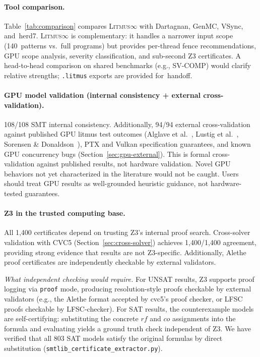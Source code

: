 \documentclass[11pt]{article}
\newcommand{\litmus}{\textsc{Litmus$\infty$}}
\begin{document}
\paragraph{Tool comparison.}
Table~\ref{tab:comparison} compares \litmus{} with
Dartagnan, GenMC, VSync, and~herd7.
\litmus{} is complementary: it handles a narrower input scope
(140~patterns vs.\ full programs) but provides per-thread fence
recommendations, GPU scope analysis, severity classification,
and sub-second Z3 certificates.
A head-to-head comparison on shared benchmarks
(e.g., SV-COMP) would clarify relative strengths;
\texttt{.litmus} exports are provided for~handoff.

\paragraph{GPU model validation (internal consistency + external cross-validation).}
108/108 SMT internal consistency. Additionally, 94/94 external
cross-validation against published GPU litmus test outcomes
(Alglave et al.~\cite{Alglave2015GPU}, Lustig et al.~\cite{Lustig2019},
Sorensen \& Donaldson~\cite{Sorensen2016}), PTX and Vulkan specification
guarantees, and known GPU concurrency bugs
(Section~\ref{sec:gpu-external}).
This is formal cross-validation against published results, not
hardware validation. Novel GPU behaviors not yet characterized
in the literature would not be caught. Users should treat GPU
results as well-grounded heuristic guidance, not hardware-tested
guarantees.

\paragraph{Z3 in the trusted computing base.}
All 1{,}400 certificates depend on trusting Z3's internal proof search.
Cross-solver validation with CVC5 (Section~\ref{sec:cross-solver})
achieves 1{,}400/1{,}400 agreement, providing strong evidence that
results are not Z3-specific.  Additionally, Alethe proof certificates
are independently checkable by external validators.

\emph{What independent checking would require.}
For UNSAT results, Z3 supports proof logging via \texttt{proof} mode,
producing resolution-style proofs checkable by external validators
(e.g., the Alethe format accepted by cvc5's proof checker, or
LFSC proofs checkable by LFSC-checker).
For SAT results, the counterexample models are self-certifying:
substituting the concrete $\mathit{rf}$ and $\mathit{co}$
assignments into the formula and evaluating yields a ground truth
check independent of Z3.
We have verified that all 803 SAT models satisfy the original
formulas by direct substitution
(\texttt{smtlib\_certificate\_\allowbreak{}extractor.py}).
\end{document}
